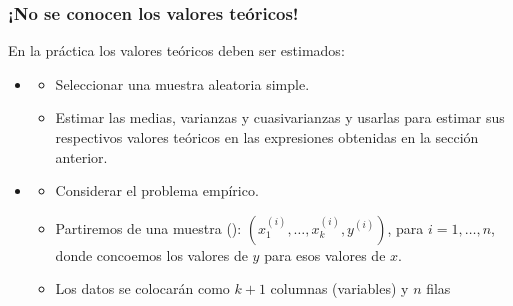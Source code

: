 \subsubsection*{¡No se conocen los valores teóricos!}
En la práctica los valores teóricos deben ser estimados:
\begin{itemize}[leftmargin=*]
	\item {}
	\begin{itemize}
		\item Seleccionar una muestra aleatoria simple.
		\item Estimar las medias, varianzas y cuasivarianzas y usarlas para estimar sus respectivos valores teóricos en las expresiones obtenidas en la sección anterior.
	\end{itemize}
	\item {}
	\begin{itemize}
		\item Considerar el problema empírico.
		\item Partiremos de una muestra (): $\left(x_1^{(i)},\dots,x_k^{(i)},y^{(i)}\right)$, para $i=1,\dots,n$, donde concoemos los valores de $y$ para esos valores de $x$.
		\item Los datos se colocarán como $k+1$ columnas (variables) y $n$ filas
	\end{itemize}
\end{itemize}